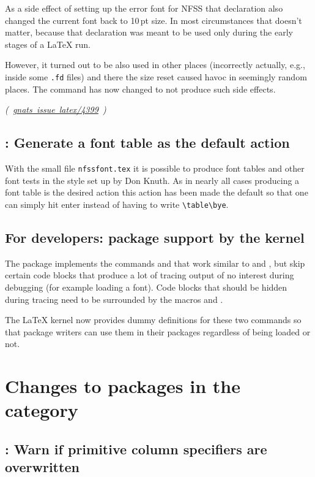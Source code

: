 \documentclass{ltnews}
\providecommand\gnatsissue[2]{\ifhmode\unskip\fi
     \quad\penalty500\strut\nobreak\hfill
     \mbox{\small\slshape(%
       \href{https://www.latex-project.org/cgi-bin/ltxbugs2html?pr=#1\%2F#2}%
                {gnats issue #1/#2}%
           )}%
     \par}
\begin{document}
As a side effect of setting up the error font for NFSS that
declaration also changed the current font back to 10\,pt size. In most
circumstances that doesn't matter, because that declaration was meant
to be used only during the early stages of a \LaTeX{} run.

However, it turned out to be also used in other places
(incorrectly actually, e.g., inside some \texttt{.fd} files) and there
the size reset caused havoc in seemingly random places. The command
has now changed to not produce such side effects.

\gnatsissue{latex}{4399}



\subsection{: Generate a font table as the default action}

With the small file \texttt{nfssfont.tex} it is possible to produce
font tables and other font tests in the style set up by Don Knuth. As
in nearly all cases producing a font table is the desired action this
action has been made the default so that one can simply hit enter
instead of having to write \verb=\table\bye=.


\subsection{For developers:  package support by the kernel}

The  package implements the commands 
and  that work similar to  and ,
but skip certain code blocks that produce a lot of tracing output of no
interest during debugging (for example loading a font).
Code blocks that should be hidden during tracing need
to be surrounded by the macros 
and .

The \LaTeX{} kernel now provides dummy definitions for these two
commands so that package writers can use them in their packages
regardless of  being loaded or not.



        
\section{Changes to packages in the  category}

\subsection{: Warn if primitive column specifiers are overwritten}
\end{document}
